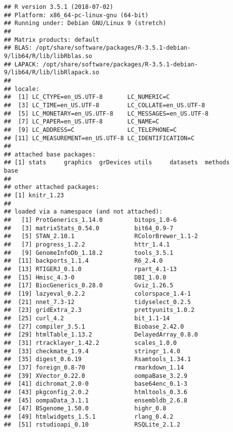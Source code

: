 \documentclass[]{article}
\begin{document}
\begin{verbatim}
## R version 3.5.1 (2018-07-02)
## Platform: x86_64-pc-linux-gnu (64-bit)
## Running under: Debian GNU/Linux 9 (stretch)
## 
## Matrix products: default
## BLAS: /opt/share/software/packages/R-3.5.1-debian-9/lib64/R/lib/libRblas.so
## LAPACK: /opt/share/software/packages/R-3.5.1-debian-9/lib64/R/lib/libRlapack.so
## 
## locale:
##  [1] LC_CTYPE=en_US.UTF-8       LC_NUMERIC=C              
##  [3] LC_TIME=en_US.UTF-8        LC_COLLATE=en_US.UTF-8    
##  [5] LC_MONETARY=en_US.UTF-8    LC_MESSAGES=en_US.UTF-8   
##  [7] LC_PAPER=en_US.UTF-8       LC_NAME=C                 
##  [9] LC_ADDRESS=C               LC_TELEPHONE=C            
## [11] LC_MEASUREMENT=en_US.UTF-8 LC_IDENTIFICATION=C       
## 
## attached base packages:
## [1] stats     graphics  grDevices utils     datasets  methods   base     
## 
## other attached packages:
## [1] knitr_1.23
## 
## loaded via a namespace (and not attached):
##   [1] ProtGenerics_1.14.0         bitops_1.0-6               
##   [3] matrixStats_0.54.0          bit64_0.9-7                
##   [5] STAN_2.10.1                 RColorBrewer_1.1-2         
##   [7] progress_1.2.2              httr_1.4.1                 
##   [9] GenomeInfoDb_1.18.2         tools_3.5.1                
##  [11] backports_1.1.4             R6_2.4.0                   
##  [13] RTIGERJ_0.1.0               rpart_4.1-13               
##  [15] Hmisc_4.3-0                 DBI_1.0.0                  
##  [17] BiocGenerics_0.28.0         Gviz_1.26.5                
##  [19] lazyeval_0.2.2              colorspace_1.4-1           
##  [21] nnet_7.3-12                 tidyselect_0.2.5           
##  [23] gridExtra_2.3               prettyunits_1.0.2          
##  [25] curl_4.2                    bit_1.1-14                 
##  [27] compiler_3.5.1              Biobase_2.42.0             
##  [29] htmlTable_1.13.2            DelayedArray_0.8.0         
##  [31] rtracklayer_1.42.2          scales_1.0.0               
##  [33] checkmate_1.9.4             stringr_1.4.0              
##  [35] digest_0.6.19               Rsamtools_1.34.1           
##  [37] foreign_0.8-70              rmarkdown_1.14             
##  [39] XVector_0.22.0              oompaBase_3.2.9            
##  [41] dichromat_2.0-0             base64enc_0.1-3            
##  [43] pkgconfig_2.0.2             htmltools_0.3.6            
##  [45] oompaData_3.1.1             ensembldb_2.6.8            
##  [47] BSgenome_1.50.0             highr_0.8                  
##  [49] htmlwidgets_1.5.1           rlang_0.4.2                
##  [51] rstudioapi_0.10             RSQLite_2.1.2              

\end{verbatim}
\end{document}
